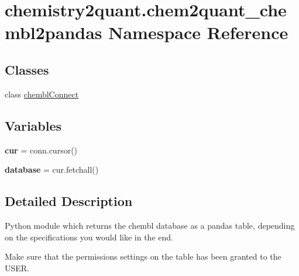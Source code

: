 \hypertarget{namespacechemistry2quant_1_1chem2quant__chembl2pandas}{}\section{chemistry2quant.\+chem2quant\+\_\+chembl2pandas Namespace Reference}
\label{namespacechemistry2quant_1_1chem2quant__chembl2pandas}
\subsection*{Classes}
\begin{DoxyCompactItemize}
\item 
class \hyperlink{classchemistry2quant_1_1chem2quant__chembl2pandas_1_1chemblConnect}{chembl\+Connect}
\end{DoxyCompactItemize}
\subsection*{Variables}
\begin{DoxyCompactItemize}
\item 
\mbox{\label{namespacechemistry2quant_1_1chem2quant__chembl2pandas_aa33e2efbebcd46b5a9a14ed84b125b99}} 
{\bfseries cur} = conn.\+cursor()
\item 
\mbox{\label{namespacechemistry2quant_1_1chem2quant__chembl2pandas_ae989c108f66c6a5bace59eeb67d9bbc6}} 
{\bfseries database} = cur.\+fetchall()
\end{DoxyCompactItemize}


\subsection{Detailed Description}
\begin{DoxyVerb}Python module which returns the chembl database as a pandas table, depending on the 
specifications you would like in the end. 

Make sure that the permissions settings on the table has been granted to the USER.
\end{DoxyVerb}
 